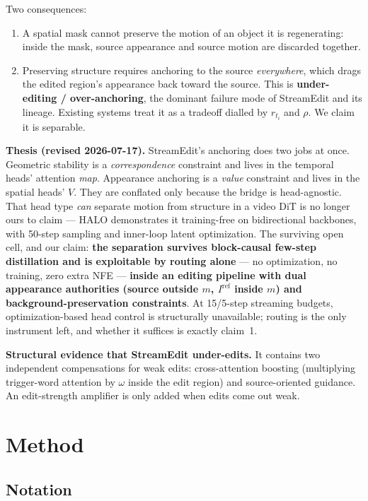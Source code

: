 \documentclass{article}
\begin{document}
Two consequences:
\begin{enumerate}
  \item A spatial mask cannot preserve the motion of an object it is
        regenerating: inside the mask, source appearance and source motion are
        discarded together.
  \item Preserving structure requires anchoring to the source \emph{everywhere},
        which drags the edited region's appearance back toward the source.
        This is \textbf{under-editing / over-anchoring}, the dominant failure
        mode of StreamEdit and its lineage. Existing systems treat it as a
        tradeoff dialled by $r_{t_i}$ and $\rho$. We claim it is separable.
\end{enumerate}

\textbf{Thesis (revised 2026-07-17).} StreamEdit's anchoring does two jobs at
once. Geometric stability is a \emph{correspondence} constraint and lives in
the temporal heads' attention \emph{map}. Appearance anchoring is a
\emph{value} constraint and lives in the spatial heads' $V$. They are
conflated only because the bridge is head-agnostic. That head type \emph{can}
separate motion from structure in a video DiT is no longer ours to claim ---
HALO demonstrates it training-free on bidirectional backbones, with 50-step
sampling and inner-loop latent optimization. The surviving open cell, and our
claim: \textbf{the separation survives block-causal few-step distillation and
is exploitable by routing alone} --- no optimization, no training, zero extra
NFE --- \textbf{inside an editing pipeline with dual appearance authorities
(source outside $m$, $I^{\mathrm{ref}}$ inside $m$) and background-preservation
constraints}. At 15/5-step streaming budgets, optimization-based head control
is structurally unavailable; routing is the only instrument left, and whether
it suffices is exactly claim~1.

\textbf{Structural evidence that StreamEdit under-edits.} It contains two
independent compensations for weak edits: cross-attention boosting (multiplying
trigger-word attention by $\omega$ inside the edit region) and source-oriented
guidance. An edit-strength amplifier is only added when edits come out weak.

\section{Method}

\subsection{Notation}
\end{document}
